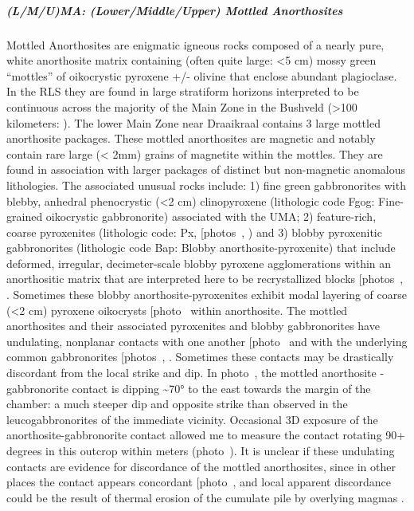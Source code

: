 \subparagraph{(L/M/U)MA: (Lower/Middle/Upper) Mottled Anorthosites}
\label{sec:ch5-unit-lmuma}

Mottled Anorthosites are enigmatic igneous rocks composed of a nearly
pure, white anorthosite matrix containing (often quite large: \textless5
cm) mossy green ``mottles'' of oikocrystic pyroxene +/- olivine that
enclose abundant plagioclase. In the RLS they are found in large
stratiform horizons interpreted to be continuous across the majority of
the Main Zone in the Bushveld (\textgreater100 kilometers:
\citealp{latypovetal2022}). The lower Main Zone near Draaikraal contains 3 large mottled
anorthosite packages. These mottled anorthosites are magnetic and
notably contain rare large (\textless{} 2mm) grains of magnetite within
the mottles. They are found in association with larger packages of
distinct but non-magnetic anomalous lithologies. The associated unusual
rocks include: 1) fine green gabbronorites with blebby, anhedral
phenocrystic (\textless2 cm) clinopyroxene (lithologic code Fgog:
Fine-grained oikocrystic gabbronorite) associated with the UMA; 2)
feature-rich, coarse pyroxenites (lithologic code: Px, {[}photos~,
\ChFivePhoto{54}{]}) and 3) blobby pyroxenitic gabbronorites (lithologic code Bap:
Blobby anorthosite-pyroxenite) that include deformed, irregular,
decimeter-scale blobby pyroxene agglomerations within an anorthositic
matrix that are interpreted here to be recrystallized blocks {[}photos~, \ChFivePhoto{108}{]}. Sometimes these blobby anorthosite-pyroxenites exhibit
modal layering of coarse (\textless2 cm) pyroxene oikocrysts {[}photo~\ChFivePhoto{105}{]} within anorthosite. The mottled anorthosites and their associated
pyroxenites and blobby gabbronorites have undulating, nonplanar contacts
with one another {[}photo~\ChFivePhoto{49}{]} and with the underlying common
gabbronorites {[}photos~, \ChFivePhoto{103}{]}. Sometimes these contacts may be
drastically discordant from the local strike and dip. In photo~, the
mottled anorthosite - gabbronorite contact is dipping \textasciitilde70°
to the east towards the margin of the chamber: a much steeper dip and
opposite strike than observed in the leucogabbronorites of the immediate
vicinity. Occasional 3D exposure of the anorthosite-gabbronorite contact
allowed me to measure the contact rotating 90+ degrees in this outcrop
within meters (photo~). It is unclear if these undulating contacts
are evidence for discordance of the mottled anorthosites, since in other
places the contact appears concordant {[}photo~\ChFivePhoto{110}{]}, and local
apparent discordance could be the result of thermal erosion of the
cumulate pile by overlying magmas \citep{roberts2007}.

